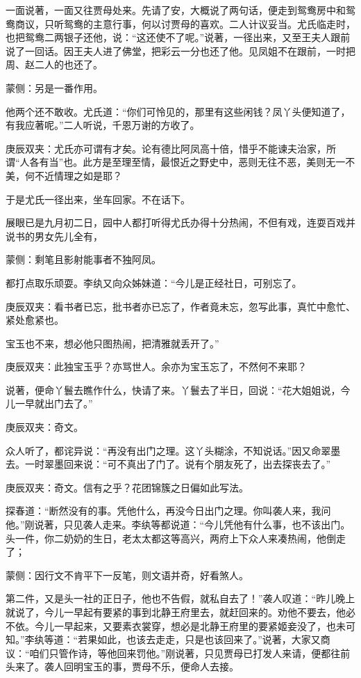 \begin{parag}
    一面说著，一面又往贾母处来。先请了安，大概说了两句话，便走到鸳鸯房中和鸳鸯商议，只听鸳鸯的主意行事，何以讨贾母的喜欢。二人计议妥当。尤氏临走时，也把鸳鸯二两银子还他，说：“这还使不了呢。”说著，一径出来，又至王夫人跟前说了一回话。因王夫人进了佛堂，把彩云一分也还了他。见凤姐不在跟前，一时把周、赵二人的也还了。\begin{note}蒙侧：另是一番作用。\end{note}他两个还不敢收。尤氏道：“你们可怜见的，那里有这些闲钱？凤丫头便知道了，有我应著呢。”二人听说，千恩万谢的方收了。\begin{note}庚辰双夹：尤氏亦可谓有才矣。论有德比阿凤高十倍，惜乎不能谏夫治家，所谓“人各有当”也。此方是至理至情，最恨近之野史中，恶则无往不恶，美则无一不美，何不近情理之如是耶？\end{note}于是尤氏一径出来，坐车回家。不在话下。
\end{parag}


\begin{parag}
    展眼已是九月初二日，园中人都打听得尤氏办得十分热闹，不但有戏，连耍百戏并说书的男女先儿全有，\begin{note}蒙侧：剩笔且影射能事者不独阿凤。\end{note}都打点取乐顽耍。李纨又向众姊妹道：“今儿是正经社日，可别忘了。\begin{note}庚辰双夹：看书者已忘，批书者亦已忘了，作者竟未忘，忽写此事，真忙中愈忙、紧处愈紧也。\end{note}宝玉也不来，想必他只图热闹，把清雅就丢开了。”\begin{note}庚辰双夹：此独宝玉乎？亦骂世人。余亦为宝玉忘了，不然何不来耶？\end{note}说著，便命丫鬟去瞧作什么，快请了来。丫鬟去了半日，回说：“花大姐姐说，今儿一早就出门去了。”\begin{note}庚辰双夹：奇文。\end{note}众人听了，都诧异说：“再没有出门之理。这丫头糊涂，不知说话。”因又命翠墨去。一时翠墨回来说：“可不真出了门了。说有个朋友死了，出去探丧去了。”\begin{note}庚辰双夹：奇文。信有之乎？花团锦簇之日偏如此写法。\end{note}探春道：“断然没有的事。凭他什么，再没今日出门之理。你叫袭人来，我问他。”刚说著，只见袭人走来。李纨等都说道：“今儿凭他有什么事，也不该出门。头一件，你二奶奶的生日，老太太都这等高兴，两府上下众人来凑热闹，他倒走了；\begin{note}蒙侧：因行文不肯平下一反笔，则文语并奇，好看煞人。\end{note}第二件，又是头一社的正日子，他也不告假，就私自去了！”袭人叹道：“昨儿晚上就说了，今儿一早起有要紧的事到北静王府里去，就赶回来的。劝他不要去，他必不依。今儿一早起来，又要素衣裳穿，想必是北静王府里的要紧姬妾没了，也未可知。”李纨等道：“若果如此，也该去走走，只是也该回来了。”说著，大家又商议：“咱们只管作诗，等他回来罚他。”刚说著，只见贾母已打发人来请，便都往前头来了。袭人回明宝玉的事，贾母不乐，便命人去接。
\end{parag}


